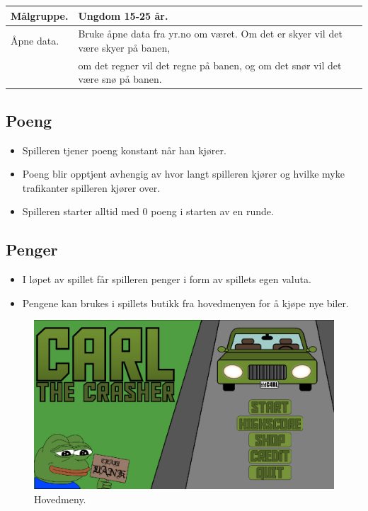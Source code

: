 \documentclass[paper=a4]{article}
\begin{document}
\newpage

\begin{center}
\begin{tabular}{ | m{5cm} | m{8cm} | }
\hline
Målgruppe. & Ungdom 15-25 år. \\ \hline



Åpne data. & Bruke åpne data fra yr.no om været. Om det er skyer vil det være skyer på banen,\\&
om det regner vil det regne på banen, og om det snør vil det være snø på banen.\\ \hline
\end{tabular}
\end{center}

		\subsection{Poeng}
		\begin{itemize}
			\item{Spilleren tjener poeng konstant når han kjører.}
			\item{Poeng blir opptjent avhengig av hvor langt spilleren kjører og hvilke myke trafikanter spilleren kjører over.}
			\item{Spilleren starter alltid med 0 poeng i starten av en runde.}
		\end{itemize}

		\subsection{Penger}
		\begin{itemize}
			\item{I løpet av spillet får spilleren penger i form av spillets egen valuta.}
			\item{Pengene kan brukes i spillets butikk fra hovedmenyen for å kjøpe nye biler.}
		\end{itemize}

	\newpage
	\begin{figure}\begin{center}
		\includegraphics[width=1.00\textwidth]{images/main_menu.PNG}
		\caption{Hovedmeny.}
	\end{center}\end{figure}
\end{document}
